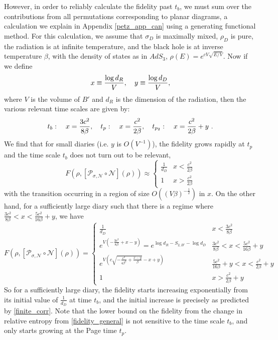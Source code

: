 \documentclass[a4paper,11pt]{article}
\newcommand{\be}{\begin{equation}}
\newcommand{\ee}{\end{equation}}
\def\b{{\beta}}
\newcommand\ov{\over}
\begin{document}
\begin{enumerate}
However, in order to reliably calculate the fidelity past $t_b$, we must sum over the contributions from all permutations corresponding to planar diagrams, a calculation we explain in Appendix \ref{petz_app_can} using a generating functional method. For this calculation, we assume that $\sigma_D$ is maximally mixed, $\rho_D$ is pure, the radiation is at infinite temperature, and the black hole is at inverse temperature $\beta$, with the density of states as in $AdS_3$, $\rho(E) = e^{c V \sqrt{E/V}}$. Now if we define 
\be
x \equiv {\log d_R \ov V} , \quad y \equiv {\log d_D \ov V}, 
\ee
where $V$ is the volume of $B'$ and $d_R$ is the dimension of the radiation, 
then the various relevant time scales are given by:
\be
t_b: \quad x = {3 c^2 \ov 8 \b}, \quad t_p: \quad x = {c^2 \ov 2 \b} , \quad t_{p_2}: \quad x = {c^2 \ov 2 \b} + y \ .
\ee
We find that for small diaries (i.e. $y$ is $O(V^{-1})$), the fidelity grows rapidly at $t_p$ and the time scale $t_b$ does not turn out to be relevant,
\be 
F(\rho , [\mathcal{P}_{\sigma,\mathcal{N}}\circ \mathcal{N}](\rho)) \approx \begin{cases} 
 \frac{1}{d_D} & x < \frac{c^2}{2\beta} \\
 1 & x > \frac{c^2}{2\beta} 
\end{cases} 
\label{small_fid}
\ee
with the transition occurring in a region of size $O((V\beta)^{-\frac{1}{2}})$ in $x$. On the other hand, for a sufficiently large diary such that
there is a regime where $\frac{3c^2}{8\beta} < x < \frac{5c^2}{16\beta} +y$, we have 
\be 
F(\rho , [\mathcal{P}_{\sigma,\mathcal{N}}\circ \mathcal{N}](\rho))
= \begin{cases} 
\frac{1}{d_D} & x< \frac{3c^2}{8\beta} \\
 e^{V(-\frac{3c^2}{8\beta} + x-y)} =e^{\log d_R-S_{2, B'}-\log d_D} & \frac{3c^2}{8\beta} < x < \frac{5c^2}{16\beta} +y \\ 
 e^{V (c \sqrt{-\frac{c^2}{4\beta^2} + \frac{x-y}{\beta}} -x+y )} & \frac{5c^2}{16\beta} +y < x < \frac{c^2}{2\beta} +y\\
 1 & x> \frac{c^2}{2\beta} +y
\end{cases} 
\label{large_fid_1}
\ee
So for a sufficiently large diary, the fidelity starts increasing exponentially from its initial value of $\frac{1}{d_D}$ at time $t_b$, and the initial increase is precisely as predicted by \eqref{finite_corr}. Note that the lower bound on the fidelity from the change in relative entropy from \eqref{fidelity_general} is not sensitive to the time scale $t_b$, and only starts growing at the Page time $t_p$. 


\end{enumerate}
\end{document}
